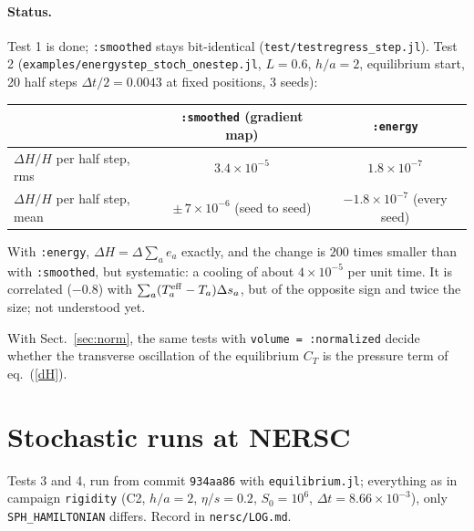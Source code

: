 \documentclass[11pt,aps,preprint,nofootinbib,superscriptaddress,tightenlines]{revtex4-2}
\def\Eq#1{eq.~(\ref{#1})}
\def\Sect#1{Sect.~\ref{#1}}
\let\oldparagraph\paragraph
\renewcommand{\paragraph}{\par\bigskip\oldparagraph}
\begin{document}
\paragraph{Status.}  Test 1 is done; \texttt{:smoothed} stays bit-identical
(\texttt{test/testregress\_step.jl}).  Test 2 (\texttt{examples/energystep\_stoch\_onestep.jl},
$L=0.6$, $h/a=2$, equilibrium start, 20 half steps $\Delta t/2=0.0043$ at fixed positions,
3 seeds):
\begin{center}
\begin{tabular}{lcc}
\hline
 & \texttt{:smoothed} (gradient map) & \texttt{:energy} \\ \hline
$\Delta H/H$ per half step, rms & $3.4\times10^{-5}$ & $1.8\times10^{-7}$ \\
$\Delta H/H$ per half step, mean & $\pm\,7\times10^{-6}$ (seed to seed) & $-1.8\times10^{-7}$ (every seed) \\
\hline
\end{tabular}
\end{center}
With \texttt{:energy}, $\Delta H=\Delta\sum_ae_a$ exactly, and the change is $200$ times smaller
than with \texttt{:smoothed}, but systematic: a cooling of about $4\times10^{-5}$ per unit
time.  It is correlated ($-0.8$) with $\sum_a(T^{\rm eff}_a-T_a)\Delta s_a$, but of the
opposite sign and twice the size; not understood yet.

With \Sect{sec:norm}, the same tests with \texttt{volume = :normalized} decide whether the
transverse oscillation of the equilibrium $C_T$ is the pressure term of \Eq{dH}.

\section{Stochastic runs at NERSC}
\label{sec:stochruns}

Tests 3 and 4, run from commit \texttt{934aa86} with \texttt{equilibrium.jl};
everything as in campaign \texttt{rigidity} (C2, $h/a=2$, $\eta/s=0.2$, $S_0=10^6$,
$\Delta t=8.66\times10^{-3}$), only \texttt{SPH\_HAMILTONIAN} differs.  Record in
\texttt{nersc/LOG.md}.
\end{document}
